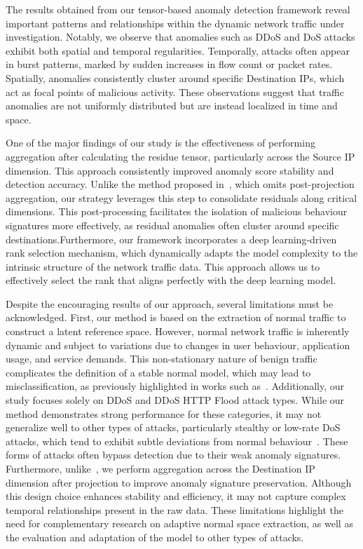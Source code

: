\documentclass[preprint,12pt,authoryear]{elsarticle}
\begin{document}
The results obtained from our tensor-based anomaly detection framework reveal important patterns and relationships within the dynamic network traffic under investigation. Notably, we observe that anomalies such as DDoS and DoS attacks exhibit both spatial and temporal regularities. Temporally, attacks often appear in burst patterns, marked by sudden increases in flow count or packet rates. Spatially, anomalies consistently cluster around specific Destination IPs, which act as focal points of malicious activity. These observations suggest that traffic anomalies are not uniformly distributed but are instead localized in time and space.

One of the major findings of our study is the effectiveness of performing aggregation after calculating the residue tensor, particularly across the Source IP dimension. This approach consistently improved anomaly score stability and detection accuracy. Unlike the method proposed in~\citep{streit2021network}, which omits post-projection aggregation, our strategy leverages this step to consolidate residuals along critical dimensions. This post-processing facilitates the isolation of malicious behaviour signatures more effectively, as residual anomalies often cluster around specific destinations.Furthermore, our framework incorporates a deep learning-driven rank selection mechanism, which dynamically adapts the model complexity to the intrinsic structure of the network traffic data. This approach allows us to effectively select the rank that aligns perfectly with the deep learning model.


Despite the encouraging results of our approach, several limitations must be acknowledged. First, our method is based on the extraction of normal traffic to construct a latent reference space. However, normal network traffic is inherently dynamic and subject to variations due to changes in user behaviour, application usage, and service demands. This non-stationary nature of benign traffic complicates the definition of a stable normal model, which may lead to misclassification, as previously highlighted in works such as~\citep{limitation2023generalization}. Additionally, our study focuses solely on DDoS and DDoS HTTP Flood attack types. While our method demonstrates strong performance for these categories, it may not generalize well to other types of attacks, particularly stealthy or low-rate DoS attacks, which tend to exhibit subtle deviations from normal behaviour~\citep{al2021machine}. These forms of attacks often bypass detection due to their weak anomaly signatures. Furthermore, unlike~\citep{streit2021network}, we perform aggregation across the Destination IP dimension after projection to improve anomaly signature preservation. Although this design choice enhances stability and efficiency, it may not capture complex temporal relationships present in the raw data. These limitations highlight the need for complementary research on adaptive normal space extraction, as well as the evaluation and adaptation of the model to other types of attacks.
\end{document}

